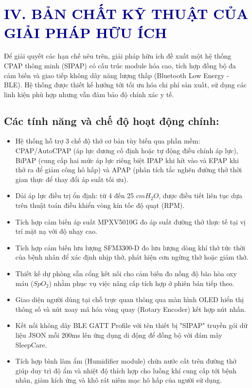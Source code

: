 \documentclass[12pt,a4paper]{article}
\begin{document}
\section{\textcolor{navy}{IV. BẢN CHẤT KỸ THUẬT CỦA GIẢI PHÁP HỮU ÍCH}}
Để giải quyết các hạn chế nêu trên, giải pháp hữu ích đề xuất một hệ thống CPAP thông minh (SIPAP) có cấu trúc module hóa cao, tích hợp đồng bộ đa cảm biến và giao tiếp không dây năng lượng thấp (Bluetooth Low Energy - BLE). Hệ thống được thiết kế hướng tới tối ưu hóa chi phí sản xuất, sử dụng các linh kiện phù hợp nhưng vẫn đảm bảo độ chính xác y tế.

\subsection{Các tính năng và chế độ hoạt động chính:}
\begin{itemize}
    \item Hệ thống hỗ trợ 3 chế độ thở cơ bản tùy biến qua phần mềm: CPAP/AutoCPAP (áp lực dương cố định hoặc tự động điều chỉnh áp lực), BiPAP (cung cấp hai mức áp lực riêng biệt IPAP khi hít vào và EPAP khi thở ra để giảm công hô hấp) và APAP (phân tích tắc nghẽn đường thở thời gian thực để thay đổi áp suất tối ưu).
    \item Dải áp lực điều trị ổn định: từ 4 đến 25 $cmH_2O$, được điều tiết liên tục dựa trên thuật toán điều khiển vòng kín tốc độ quạt (RPM).
    \item Tích hợp cảm biến áp suất MPXV5010G đo áp suất đường thở thực tế tại vị trí mặt nạ với độ nhạy cao.
    \item Tích hợp cảm biến lưu lượng SFM3300-D đo lưu lượng dòng khí thở tức thời của bệnh nhân để xác định nhịp thở, phát hiện cơn ngừng thở hoặc giảm thở.
    \item Thiết kế dự phòng sẵn cổng kết nối cho cảm biến đo nồng độ bão hòa oxy máu ($SpO_2$) nhằm phục vụ việc nâng cấp tích hợp ở phiên bản tiếp theo.
    \item Giao diện người dùng tại chỗ trực quan thông qua màn hình OLED hiển thị thông số và nút xoay mã hóa vòng quay (Rotary Encoder) kết hợp nút nhấn.
    \item Kết nối không dây BLE GATT Profile với tên thiết bị "SIPAP" truyền gói dữ liệu JSON mỗi 200ms lên ứng dụng di động để đồng bộ với đám mây SleepCare.
    \item Tích hợp bình làm ẩm (Humidifier module) chứa nước cất trên đường thở giúp duy trì độ ẩm và nhiệt độ thích hợp cho luồng khí cung cấp tới bệnh nhân, giảm kích ứng và khô rát niêm mạc hô hấp của người sử dụng.
\end{itemize}
\end{document}
